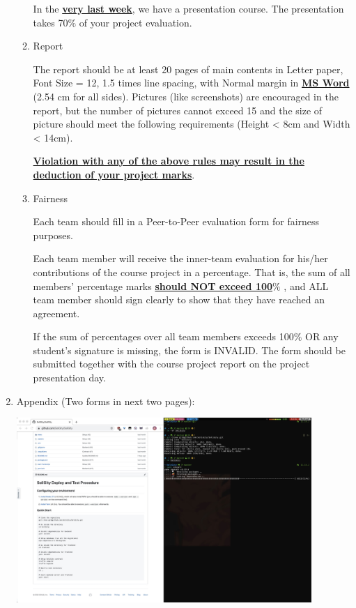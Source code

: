 \documentclass[12pt]{article}
\renewcommand{\_}{\kern-1.5pt\textunderscore\kern-1.5pt}
\begin{document}
\begin{enumerate}
\begin{enumerate}
		            In the \textbf{\uline{very last week}}, we have a presentation course. The presentation takes 70$\%$  of your project evaluation. \par

		      \item Report\par

		            The report should be at least 20 pages of main contents in Letter paper, Font Size = 12, 1.5 times line spacing, with Normal margin in \textbf{\uline{MS Word}} (2.54 cm for all sides). Pictures (like screenshots) are encouraged in the report, but the number of pictures cannot exceed 15 and the size of picture should meet the following requirements (Height < 8cm and Width < 14cm).\par

		            \textbf{\uline{Violation with any of the above rules may result in the deduction of your project marks}}.\par

		      \item Fairness\par

		            Each team should fill in a Peer-to-Peer evaluation form for fairness purposes.\par

		            Each team member will receive the inner-team evaluation for his/her contributions of the course project in a percentage. That is, the sum of all members’ percentage marks \textbf{\uline{should NOT exceed 100}}$\%$ , and ALL team member should sign clearly to show that they have reached an agreement.\par

		            If the sum of percentages over all team members exceeds 100$\%$  OR any student’s signature is missing, the form is INVALID. The form should be submitted together with the course project report on the project presentation day.\par


		            \vspace{\baselineskip}

	      \end{enumerate}
	\item Appendix (Two forms in next two pages):


	      \includegraphics[height=7cm]{graphs/01. git_clone}


\end{enumerate}
\end{document}
